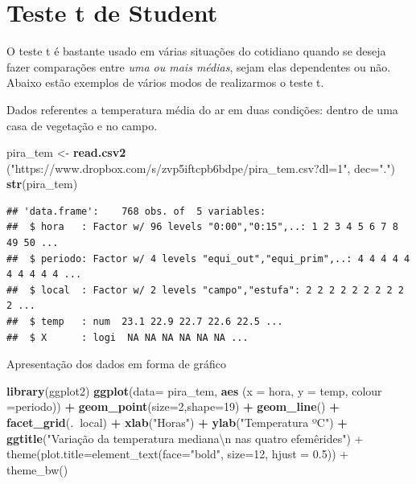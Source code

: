 \documentclass[
]{book}
\newenvironment{Shaded}{\begin{snugshade}}{\end{snugshade}}
\newcommand{\CharTok}[1]{\textcolor[rgb]{0.31,0.60,0.02}{#1}}
\newcommand{\DataTypeTok}[1]{\textcolor[rgb]{0.13,0.29,0.53}{#1}}
\newcommand{\DecValTok}[1]{\textcolor[rgb]{0.00,0.00,0.81}{#1}}
\newcommand{\KeywordTok}[1]{\textcolor[rgb]{0.13,0.29,0.53}{\textbf{#1}}}
\newcommand{\NormalTok}[1]{#1}
\newcommand{\OperatorTok}[1]{\textcolor[rgb]{0.81,0.36,0.00}{\textbf{#1}}}
\newcommand{\StringTok}[1]{\textcolor[rgb]{0.31,0.60,0.02}{#1}}
\begin{document}
\hypertarget{teste-t-de-student}{%
\section{Teste t de Student}\label{teste-t-de-student}}

O teste t é bastante usado em várias situações do cotidiano quando se deseja fazer comparações entre \emph{uma ou mais médias}, sejam elas dependentes ou não.
Abaixo estão exemplos de vários modos de realizarmos o teste t.

Dados referentes a temperatura média do ar em duas condições: dentro de uma casa de vegetação e no campo.

\begin{Shaded}
\begin{Highlighting}[]
\NormalTok{pira_tem <-}\StringTok{ }\KeywordTok{read.csv2}\NormalTok{ (}\StringTok{"https://www.dropbox.com/s/zvp5iftcpb6bdpe/pira_tem.csv?dl=1"}\NormalTok{,}
  \DataTypeTok{dec=}\StringTok{"."}\NormalTok{)}
\KeywordTok{str}\NormalTok{(pira_tem)}
\end{Highlighting}
\end{Shaded}

\begin{verbatim}
## 'data.frame':    768 obs. of  5 variables:
##  $ hora   : Factor w/ 96 levels "0:00","0:15",..: 1 2 3 4 5 6 7 8 49 50 ...
##  $ periodo: Factor w/ 4 levels "equi_out","equi_prim",..: 4 4 4 4 4 4 4 4 4 4 ...
##  $ local  : Factor w/ 2 levels "campo","estufa": 2 2 2 2 2 2 2 2 2 2 ...
##  $ temp   : num  23.1 22.9 22.7 22.6 22.5 ...
##  $ X      : logi  NA NA NA NA NA NA ...
\end{verbatim}

Apresentação dos dados em forma de gráfico

\begin{Shaded}
\begin{Highlighting}[]
\KeywordTok{library}\NormalTok{(ggplot2)}
\KeywordTok{ggplot}\NormalTok{(}\DataTypeTok{data=}\NormalTok{ pira_tem, }\KeywordTok{aes}\NormalTok{ (}\DataTypeTok{x =}\NormalTok{ hora, }\DataTypeTok{y =}\NormalTok{ temp, }\DataTypeTok{colour =}\NormalTok{periodo)) }\OperatorTok{+}
\StringTok{  }\KeywordTok{geom_point}\NormalTok{(}\DataTypeTok{size=}\DecValTok{2}\NormalTok{,}\DataTypeTok{shape=}\DecValTok{19}\NormalTok{) }\OperatorTok{+}
\StringTok{  }\KeywordTok{geom_line}\NormalTok{() }\OperatorTok{+}
\StringTok{  }\KeywordTok{facet_grid}\NormalTok{(.}\OperatorTok{~}\NormalTok{local) }\OperatorTok{+}
\StringTok{  }\KeywordTok{xlab}\NormalTok{(}\StringTok{"Horas"}\NormalTok{) }\OperatorTok{+}
\StringTok{  }\KeywordTok{ylab}\NormalTok{(}\StringTok{"Temperatura ºC"}\NormalTok{) }\OperatorTok{+}\StringTok{ }
\StringTok{             }\KeywordTok{ggtitle}\NormalTok{(}\StringTok{"Variação da temperatura mediana}\CharTok{\textbackslash{}n}\StringTok{ nas quatro efemêrides") +}
\StringTok{             theme(plot.title=element_text(face="}\NormalTok{bold}\StringTok{", size=12, hjust = 0.5))  +}
\StringTok{  theme_bw()}
\end{Highlighting}
\end{Shaded}
\end{document}
